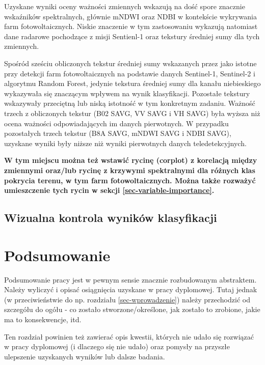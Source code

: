\documentclass{amuthesis}
\begin{document}
Uzyskane wyniki oceny ważności zmiennych wskazują na dość spore znacznie
wskaźników spektralnych, głównie mNDWI oraz NDBI w kontekście wykrywania
farm fotowoltaicznych. Niskie znaczenie w tym zastosowaniu wykazują
natomiast dane radarowe pochodzące z misji Sentienl-1 oraz tekstury
średniej sumy dla tych zmiennych.

Spośród sześciu obliczonych tekstur średniej sumy wskazanych przez
\textcite{wang_2022_pv} jako istotne przy detekcji farm fotowoltaicznych
na podstawie danych Sentinel-1, Sentinel-2 i algorytmu Random Forest,
jedynie tekstura średniej sumy dla kanału niebieskiego wykazywała się
znaczącym wpływem na wynik klasyfikacji. Pozostałe tekstury wskazywały
przeciętną lub niską istotność w tym konkretnym zadaniu. Ważność trzech
z obliczonych tekstur (B02 SAVG, VV SAVG i VH SAVG) była wyższa niż
ocena ważności odpowiadających im danych pierwotnych. W przypadku
pozostałych trzech tekstur (B8A SAVG, mNDWI SAVG i NDBI SAVG), uzyskane
wyniki były niższe niż wyniki pierwotnych danych teledetekcyjnych.

\textbf{W tym miejscu można też wstawić rycinę (corplot) z korelacją
między zmiennymi oraz/lub rycinę z krzywymi spektralnymi dla różnych
klas pokrycia terenu, w tym farm fotowoltaicznych. Można także rozważyć
umieszczenie tych rycin w sekcji \ref{sec-variable-importance}.}

\hypertarget{wizualna-kontrola-wynikuxf3w-klasyfikacji}{%
\section{Wizualna kontrola wyników
klasyfikacji}\label{wizualna-kontrola-wynikuxf3w-klasyfikacji}}


\hypertarget{podsumowanie}{%
\chapter{Podsumowanie}\label{podsumowanie}}

Podsumowanie pracy jest w pewnym sensie znacznie rozbudowanym
abstraktem. Należy wyliczyć i opisać osiągnięcia uzyskane w pracy
dyplomowej. Tutaj jednak (w przeciwieństwie do np. rozdziału
\ref{sec-wprowadzenie}) należy przechodzić od szczegółu do ogółu - co
zostało stworzone/określone, jak zostało to zrobione, jakie ma to
konsekwencje, itd.

Ten rozdział powinien też zawierać opis kwestii, których nie udało się
rozwiązać w pracy dyplomowej (i dlaczego się nie udało) oraz pomysły na
przyszłe ulepszenie uzyskanych wyników lub dalsze badania.

\printbibliography[heading=bibintoc, title=Bibliografia]
\end{document}
